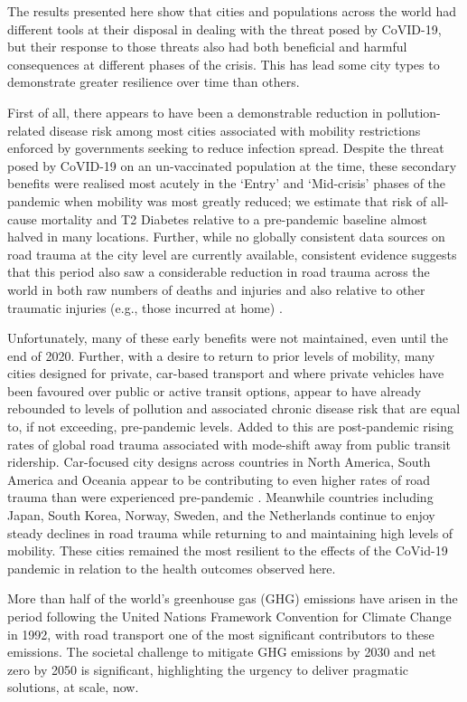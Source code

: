 \documentclass[preprint,12pt]{elsarticle}
\begin{document}
The results presented here show that cities and populations across the world had different tools at their disposal in dealing with the threat posed by CoVID-19, but their response to those threats also had both beneficial and harmful consequences at different phases of the crisis. This has lead some city types to demonstrate greater resilience over time than others.

First of all, there appears to have been a demonstrable reduction in pollution-related disease risk among most cities associated with mobility restrictions enforced by governments seeking to reduce infection spread. Despite the threat posed by CoVID-19 on an un-vaccinated population at the time, these secondary benefits were realised most acutely in the `Entry' and `Mid-crisis' phases of the pandemic when mobility was most greatly reduced; we estimate that risk of all-cause mortality and T2 Diabetes relative to a pre-pandemic baseline almost halved in many locations. Further, while no globally consistent data sources on road trauma at the city level are currently available, consistent evidence suggests that this period also saw a considerable reduction in road trauma across the world in both raw numbers of deaths and injuries \cite{saladie2023back} and also relative to other traumatic injuries (e.g., those incurred at home) \cite{WASEEM2021200}.

Unfortunately, many of these early benefits were not maintained, even until the end of 2020. Further, with a desire to return to prior levels of mobility, many cities designed for private, car-based transport and where private vehicles have been favoured over public or active transit options\cite{DAS20211}, appear to have already rebounded to levels of pollution and associated chronic disease risk that are equal to, if not exceeding, pre-pandemic levels. Added to this are post-pandemic rising rates of global road trauma associated with mode-shift away from public transit ridership. Car-focused city designs across countries in North America, South America and Oceania appear to be contributing to even higher rates of road trauma than were experienced pre-pandemic \cite{ITFRS}. Meanwhile countries including Japan, South Korea, Norway, Sweden, and the Netherlands continue to enjoy steady declines in road trauma while returning to and maintaining high levels of mobility. These cities remained the most resilient to the effects of the CoVid-19 pandemic in relation to the health outcomes observed here.


More than half of the world's greenhouse gas (GHG) emissions have arisen in the period following the United Nations Framework Convention for Climate Change in 1992\cite{bashmakov2022climate}, with road transport one of the most significant contributors to these emissions. The societal challenge to mitigate GHG emissions by 2030 and net zero by 2050\cite{lynskey2020moving} is significant, highlighting the urgency to deliver pragmatic solutions, at scale, now.
\end{document}
